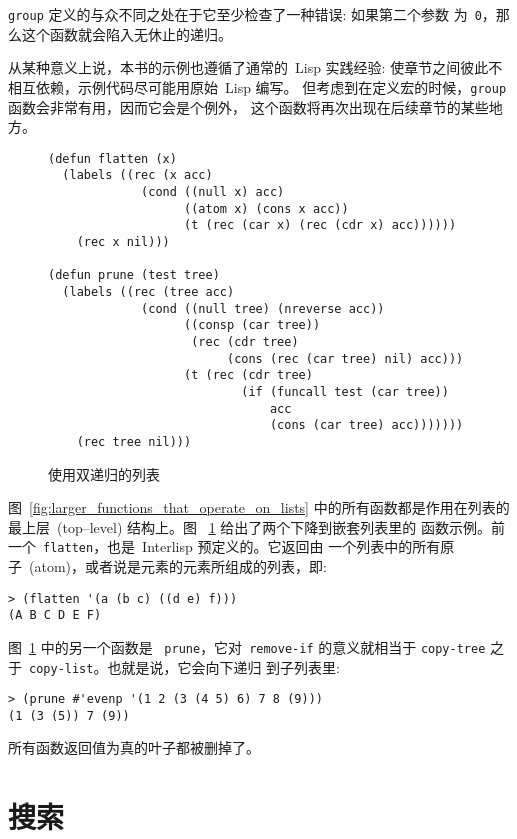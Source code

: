 \texttt{group} 定义的与众不同之处在于它至少检查了一种错误: 如果第二个参数
为~\verb|0|，那么这个函数就会陷入无休止的递归。

从某种意义上说，本书的示例也遵循了通常的~Lisp 实践经验:
使章节之间彼此不相互依赖，示例代码尽可能用原始~Lisp 编写。
但考虑到在定义宏的时候，\texttt{group} 函数会非常有用，因而它会是个例外，
这个函数将再次出现在后续章节的某些地方。

\begin{figure}
\begin{lstlisting}
(defun flatten (x)
  (labels ((rec (x acc)
             (cond ((null x) acc)
                   ((atom x) (cons x acc))
                   (t (rec (car x) (rec (cdr x) acc))))))
    (rec x nil)))

(defun prune (test tree)
  (labels ((rec (tree acc)
             (cond ((null tree) (nreverse acc))
                   ((consp (car tree))
                    (rec (cdr tree)
                         (cons (rec (car tree) nil) acc)))
                   (t (rec (cdr tree)
                           (if (funcall test (car tree))
                               acc
                               (cons (car tree) acc)))))))
    (rec tree nil)))
\end{lstlisting}
\caption{\label{fig:doubly-recursive_list_utilities}
  使用双递归的列表\utility{}}
\end{figure}

图~\ref{fig:larger_functions_that_operate_on_lists}
中的所有函数都是作用在列表的最上层~(top--level) 结构上。图
~\ref{fig:doubly-recursive_list_utilities} 给出了两个下降到嵌套列表里的
函数示例。前一个~\texttt{flatten}，也是~Interlisp 预定义的。它返回由
一个列表中的所有原子~(atom)，或者说是元素的元素所组成的列表，即:
\begin{lstlisting}
> (flatten '(a (b c) ((d e) f)))
(A B C D E F)
\end{lstlisting}

图~\ref{fig:doubly-recursive_list_utilities} 中的另一个函数是
~\texttt{prune}，它对~\texttt{remove-if} 的意义就相当于
\texttt{copy-tree} 之于~\texttt{copy-list}。也就是说，它会向下递归
到子列表里:
\begin{lstlisting}
> (prune #'evenp '(1 2 (3 (4 5) 6) 7 8 (9)))
(1 (3 (5)) 7 (9))
\end{lstlisting}
所有函数返回值为真的叶子都被删掉了。

\section{搜索}
\label{sec:search}

